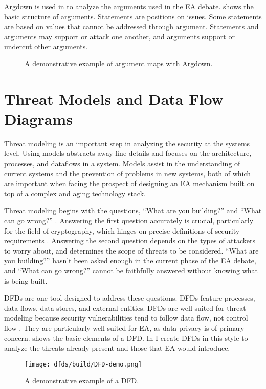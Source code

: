 Argdown is used in  to analyze the arguments used in the \ac{EA} debate. 
shows the basic structure of arguments. Statements are positions on issues. Some statements are based on values that
cannot be addressed through argument. Statements and arguments may support or attack one another, and arguments support
or undercut other arguments.

\begin{figure}[ht]
    \centering\CaptionFontSize
    \caption[Argdown Demo]{A demonstrative example of argument maps with Argdown.}
    \label{fig-args-demo}
\end{figure}


\section{Threat Models and Data Flow Diagrams}
\label{sec-threat-model-intro}

Threat modeling is an important step in analyzing the security at the systems level. Using models abstracts away fine
details and focuses on the architecture, processes, and dataflows in a system. Models assist in the understanding of
current systems and the prevention of problems in new systems, both of which are important when facing the prospect of
designing an \ac{EA} mechanism built on top of a complex and aging technology stack.

Threat modeling begins with the questions, ``What are you building?'' and ``What can go wrong?''
\cite{shostack_threat_2014}. Answering the first question accurately is crucial, particularly for the field of
cryptography, which hinges on precise definitions of security requirements \cite{varia_2018}. Answering the second
question depends on the types of attackers to worry about, and determines the scope of threats to be considered. ``What
are you building?'' hasn't been asked enough in the current phase of the \ac{EA} debate, and ``What can go wrong?''
cannot be faithfully answered without knowing what is being built.

\Acp{DFD} are one tool designed to address these questions. \Acp{DFD} feature processes, data flows, data stores, and
external entities. \Acp{DFD} are well suited for threat modeling because security vulnerabilities tend to follow data
flow, not control flow \cite{shostack_threat_2014}. They are particularly well suited for \ac{EA}, as data privacy is of
primary concern.  shows the basic elements of a \ac{DFD}. In  I create
\acp{DFD} in this style to analyze the threats already present and those that \ac{EA} would introduce.

\begin{figure}[ht]
    \centering\CaptionFontSize
    \texttt{[image: dfds/build/DFD-demo.png]}
    \caption[\Acs{DFD} Demo]{A demonstrative example of a \acf{DFD}.}
    \label{fig-dfd-demo}
\end{figure}
